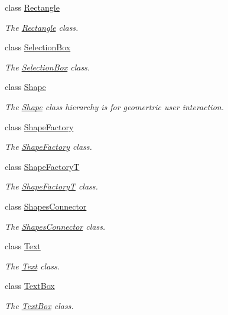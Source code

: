 \begin{DoxyCompactItemize}
class \hyperlink{classcanvascv_1_1Rectangle}{Rectangle}
\begin{DoxyCompactList}\small\item\em The \hyperlink{classcanvascv_1_1Rectangle}{Rectangle} class. \end{DoxyCompactList}\item 
class \hyperlink{classcanvascv_1_1SelectionBox}{Selection\+Box}
\begin{DoxyCompactList}\small\item\em The \hyperlink{classcanvascv_1_1SelectionBox}{Selection\+Box} class. \end{DoxyCompactList}\item 
class \hyperlink{classcanvascv_1_1Shape}{Shape}
\begin{DoxyCompactList}\small\item\em The \hyperlink{classcanvascv_1_1Shape}{Shape} class hierarchy is for geomertric user interaction. \end{DoxyCompactList}\item 
class \hyperlink{classcanvascv_1_1ShapeFactory}{Shape\+Factory}
\begin{DoxyCompactList}\small\item\em The \hyperlink{classcanvascv_1_1ShapeFactory}{Shape\+Factory} class. \end{DoxyCompactList}\item 
class \hyperlink{classcanvascv_1_1ShapeFactoryT}{Shape\+FactoryT}
\begin{DoxyCompactList}\small\item\em The \hyperlink{classcanvascv_1_1ShapeFactoryT}{Shape\+FactoryT} class. \end{DoxyCompactList}\item 
class \hyperlink{classcanvascv_1_1ShapesConnector}{Shapes\+Connector}
\begin{DoxyCompactList}\small\item\em The \hyperlink{classcanvascv_1_1ShapesConnector}{Shapes\+Connector} class. \end{DoxyCompactList}\item 
class \hyperlink{classcanvascv_1_1Text}{Text}
\begin{DoxyCompactList}\small\item\em The \hyperlink{classcanvascv_1_1Text}{Text} class. \end{DoxyCompactList}\item 
class \hyperlink{classcanvascv_1_1TextBox}{Text\+Box}
\begin{DoxyCompactList}\small\item\em The \hyperlink{classcanvascv_1_1TextBox}{Text\+Box} class. \end{DoxyCompactList}\item 

\end{DoxyCompactItemize}
